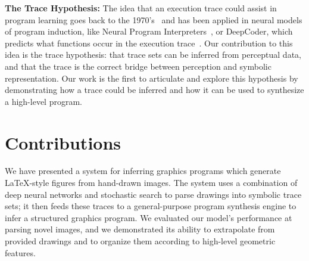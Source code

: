 \documentclass{article}
\theoremstyle{definition}
\begin{document}
\textbf{The Trace Hypothesis:} The idea that an execution trace could assist in program learning goes back to the 1970's~\citep{Summers:1977:MLP:321992.322002} and has  been applied in neural models of program induction, like Neural Program Interpreters~\citep{DBLP:journals/corr/ReedF15}, or DeepCoder, which predicts what functions occur in the execution trace~\citep{BalGauBroetal16}.
Our contribution to this idea is the trace hypothesis:
that  trace sets can be inferred from perceptual data,
and that the trace is the correct bridge between perception and symbolic representation.
Our work is the first to articulate and explore this hypothesis
by demonstrating how a trace could be inferred and how it can be used to synthesize a high-level program.




\section{Contributions}

We have presented a system for inferring graphics programs which generate \LaTeX-style figures from hand-drawn images. The system uses a combination of deep neural networks and stochastic search to parse drawings into symbolic trace sets; it then feeds these traces to a general-purpose program synthesis engine to infer a structured graphics program. We evaluated our model's performance at parsing novel images, and we demonstrated its ability to extrapolate from provided drawings and to organize them according to high-level geometric features.
\end{document}
